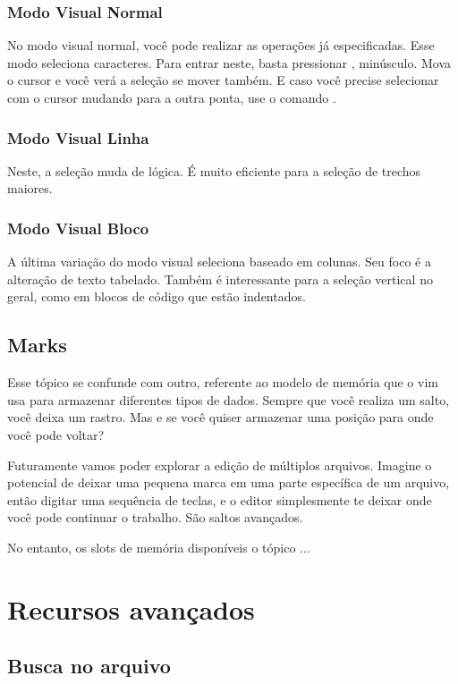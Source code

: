 \documentclass[a4paper, 12pt]{article}
\begin{document}
\subsubsection{Modo Visual Normal}
No modo visual normal, você pode realizar as operações já especificadas.
Esse modo seleciona caracteres.
Para entrar neste, basta pressionar , minúsculo.
Mova o cursor e você verá a seleção se mover também.
E caso você precise selecionar com o cursor mudando para a outra ponta, use o comando .

\subsubsection{Modo Visual Linha}
Neste, a seleção muda de lógica.
É muito eficiente para a seleção de trechos maiores.

\subsubsection{Modo Visual Bloco}
A última variação do modo visual seleciona baseado em colunas.
Seu foco é a alteração de texto tabelado.
Também é interessante para a seleção vertical no geral, como em blocos de código que estão indentados.

\subsection{Marks}
Esse tópico se confunde com outro, referente ao modelo de memória que o vim usa para armazenar diferentes tipos de dados.
Sempre que você realiza um salto, você deixa um rastro.
Mas e se você quiser armazenar uma posição para onde você pode voltar?

Futuramente vamos poder explorar a edição de múltiplos arquivos.
Imagine o potencial de deixar uma pequena marca em uma parte específica de um arquivo,
então digitar uma sequência de teclas, e o editor simplesmente te deixar onde você pode continuar o trabalho.
São saltos avançados.

No entanto, os slots de memória disponíveis o tópico 
...

\newpage
\section{Recursos avançados}
\subsection{Busca no arquivo}
\end{document}
